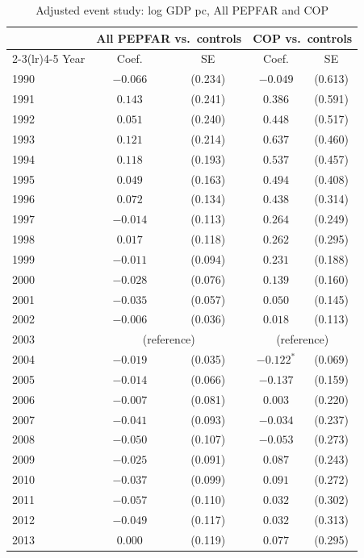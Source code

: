 \begin{table}[htbp]
\centering
\small
\caption{Adjusted event study: log GDP pc, All PEPFAR and COP}
\label{tab:crown_es_combined_log_gdp_pc}
\begin{tabular}{lcccc}
\toprule
 & \multicolumn{2}{c}{All PEPFAR vs.\ controls} & \multicolumn{2}{c}{COP vs.\ controls} \\
\cmidrule(lr){2-3}\cmidrule(lr){4-5}
Year & Coef. & SE & Coef. & SE \\
\midrule
1990 & $-0.066$ & (0.234) & $-0.049$ & (0.613) \\
1991 & $0.143$ & (0.241) & $0.386$ & (0.591) \\
1992 & $0.051$ & (0.240) & $0.448$ & (0.517) \\
1993 & $0.121$ & (0.214) & $0.637$ & (0.460) \\
1994 & $0.118$ & (0.193) & $0.537$ & (0.457) \\
1995 & $0.049$ & (0.163) & $0.494$ & (0.408) \\
1996 & $0.072$ & (0.134) & $0.438$ & (0.314) \\
1997 & $-0.014$ & (0.113) & $0.264$ & (0.249) \\
1998 & $0.017$ & (0.118) & $0.262$ & (0.295) \\
1999 & $-0.011$ & (0.094) & $0.231$ & (0.188) \\
2000 & $-0.028$ & (0.076) & $0.139$ & (0.160) \\
2001 & $-0.035$ & (0.057) & $0.050$ & (0.145) \\
2002 & $-0.006$ & (0.036) & $0.018$ & (0.113) \\
2003 & \multicolumn{2}{c}{(reference)} & \multicolumn{2}{c}{(reference)} \\
2004 & $-0.019$ & (0.035) & $-0.122^{*}$ & (0.069) \\
2005 & $-0.014$ & (0.066) & $-0.137$ & (0.159) \\
2006 & $-0.007$ & (0.081) & $0.003$ & (0.220) \\
2007 & $-0.041$ & (0.093) & $-0.034$ & (0.237) \\
2008 & $-0.050$ & (0.107) & $-0.053$ & (0.273) \\
2009 & $-0.025$ & (0.091) & $0.087$ & (0.243) \\
2010 & $-0.037$ & (0.099) & $0.091$ & (0.272) \\
2011 & $-0.057$ & (0.110) & $0.032$ & (0.302) \\
2012 & $-0.049$ & (0.117) & $0.032$ & (0.313) \\
2013 & $0.000$ & (0.119) & $0.077$ & (0.295) \\

\end{tabular}
\end{table}
